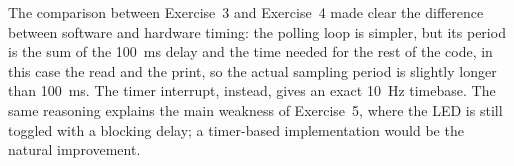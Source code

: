 \documentclass[english]{article}
\begin{document}
The comparison between Exercise~3 and Exercise~4 made clear the difference between software and hardware
timing: the polling loop is simpler, but its period is the sum of the 100~ms delay and the time needed for
the rest of the code, in this case the read and the print, so the actual sampling period is slightly longer
than 100~ms. The timer interrupt, instead, gives an exact 10~Hz timebase. The same reasoning explains the
main weakness of Exercise~5, where the LED is still toggled with a blocking delay; a timer-based
implementation would be the natural improvement.
\end{document}
